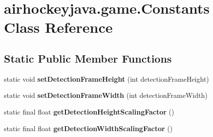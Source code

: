 \hypertarget{classairhockeyjava_1_1game_1_1_constants}{}\section{airhockeyjava.\+game.\+Constants Class Reference}
\label{classairhockeyjava_1_1game_1_1_constants}
\subsection*{Static Public Member Functions}
\begin{DoxyCompactItemize}
\item 
\hypertarget{classairhockeyjava_1_1game_1_1_constants_a533e49415e40fe1da07b309aac9f9951}{}static void {\bfseries set\+Detection\+Frame\+Height} (int detection\+Frame\+Height)\label{classairhockeyjava_1_1game_1_1_constants_a533e49415e40fe1da07b309aac9f9951}

\item 
\hypertarget{classairhockeyjava_1_1game_1_1_constants_a3db2de412e7310bd49cee26f83486fab}{}static void {\bfseries set\+Detection\+Frame\+Width} (int detection\+Frame\+Width)\label{classairhockeyjava_1_1game_1_1_constants_a3db2de412e7310bd49cee26f83486fab}

\item 
\hypertarget{classairhockeyjava_1_1game_1_1_constants_acd53c5eab7375b5162d2117d2e5fe7cd}{}static final float {\bfseries get\+Detection\+Height\+Scaling\+Factor} ()\label{classairhockeyjava_1_1game_1_1_constants_acd53c5eab7375b5162d2117d2e5fe7cd}

\item 
\hypertarget{classairhockeyjava_1_1game_1_1_constants_abb3d03cce61d599ca0b5404879a76695}{}static final float {\bfseries get\+Detection\+Width\+Scaling\+Factor} ()\label{classairhockeyjava_1_1game_1_1_constants_abb3d03cce61d599ca0b5404879a76695}

\end{DoxyCompactItemize}
